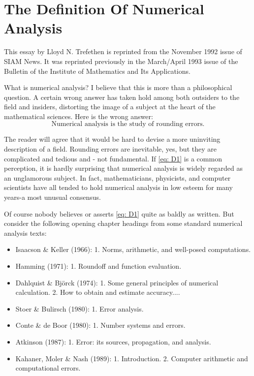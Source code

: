 \appendix 

\chapter{The Definition Of Numerical Analysis}


\begin{note}
    This essay by Lloyd N. Trefethen is reprinted from the November 1992 issue of SIAM News. It was reprinted previously in the March/April 1993 issue of the Bulletin of the Institute of Mathematics and Its Applications.
\end{note}



What is numerical analysis? I believe that this is more than a philosophical question. A certain wrong answer has taken hold among both outsiders to the field and insiders, distorting the image of a subject at the heart of the mathematical sciences.
Here is the wrong answer:
\begin{equation}
\label{eq: D1}
\text{ Numerical analysis is the study of rounding errors. } \tag{D1}
\end{equation}

The reader will agree that it would be hard to devise a more uninviting description of a field. Rounding errors are inevitable, yes, but they are complicated and tedious and - not fundamental. If \eqref{eq: D1} is a common perception, it is hardly surprising that numerical analysis is widely regarded as an unglamorous subject. In fact, mathematicians, physicists, and computer scientists have all tended to hold numerical analysis in low esteem for many years-a most unusual consensus.

Of course nobody believes or asserts \eqref{eq: D1} quite as baldly as written. But consider the following opening chapter headings from some standard numerical analysis texts:
\begin{itemize}
    \item Isaacson \& Keller (1966): 1. Norms, arithmetic, and well-posed computations.
    \item Hamming (1971): 1. Roundoff and function evaluation.
    \item Dahlquist \& Björck (1974): 1. Some general principles of numerical calculation.
    2. How to obtain and estimate accuracy....
    \item Stoer \& Bulirsch (1980): 1. Error analysis.
    \item Conte \& de Boor (1980): 1. Number systems and errors.
    \item Atkinson (1987): 1. Error: its sources, propagation, and analysis.
    \item Kahaner, Moler \& Nash (1989): 1. Introduction.
    2. Computer arithmetic and computational errors.
\end{itemize}

